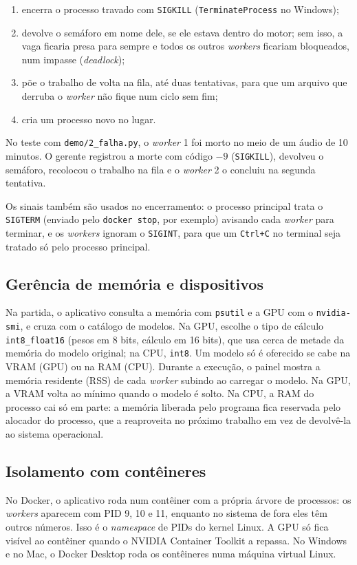 \documentclass[12pt,a4paper]{article}
\begin{document}
\begin{enumerate}
  \item encerra o processo travado com \texttt{SIGKILL} (\texttt{TerminateProcess} no Windows);
  \item devolve o semáforo em nome dele, se ele estava dentro do motor; sem isso, a vaga
        ficaria presa para sempre e todos os outros \emph{workers} ficariam bloqueados,
        num impasse (\emph{deadlock});
  \item põe o trabalho de volta na fila, até duas tentativas, para que um arquivo que derruba
        o \emph{worker} não fique num ciclo sem fim;
  \item cria um processo novo no lugar.
\end{enumerate}

No teste com \texttt{demo/2\_falha.py}, o \emph{worker} 1 foi morto no meio de um áudio de
10 minutos. O gerente registrou a morte com código $-9$ (\texttt{SIGKILL}), devolveu o
semáforo, recolocou o trabalho na fila e o \emph{worker} 2 o concluiu na segunda tentativa.

Os sinais também são usados no encerramento: o processo principal trata o \texttt{SIGTERM}
(enviado pelo \texttt{docker stop}, por exemplo) avisando cada \emph{worker} para terminar, e
os \emph{workers} ignoram o \texttt{SIGINT}, para que um \texttt{Ctrl+C} no terminal seja
tratado só pelo processo principal.

\subsection{Gerência de memória e dispositivos}
Na partida, o aplicativo consulta a memória com \texttt{psutil} e a GPU com o
\texttt{nvidia-smi}, e cruza com o catálogo de modelos. Na GPU, escolhe o tipo de cálculo
\texttt{int8\_float16} (pesos em 8 bits, cálculo em 16 bits), que usa cerca de metade da
memória do modelo original; na CPU, \texttt{int8}. Um modelo só é oferecido se cabe na VRAM
(GPU) ou na RAM (CPU). Durante a execução, o painel mostra a memória residente (RSS) de cada
\emph{worker} subindo ao carregar o modelo. Na GPU, a VRAM volta ao mínimo quando o modelo é
solto. Na CPU, a RAM do processo cai só em parte: a memória liberada pelo programa fica
reservada pelo alocador do processo, que a reaproveita no próximo trabalho em vez de
devolvê-la ao sistema operacional.

\subsection{Isolamento com contêineres}
No Docker, o aplicativo roda num contêiner com a própria árvore de processos: os
\emph{workers} aparecem com PID 9, 10 e 11, enquanto no sistema de fora eles têm outros
números. Isso é o \emph{namespace} de PIDs do kernel Linux. A GPU só fica visível ao contêiner
quando o NVIDIA Container Toolkit a repassa. No Windows e no Mac, o Docker Desktop roda os
contêineres numa máquina virtual Linux.
\end{document}
